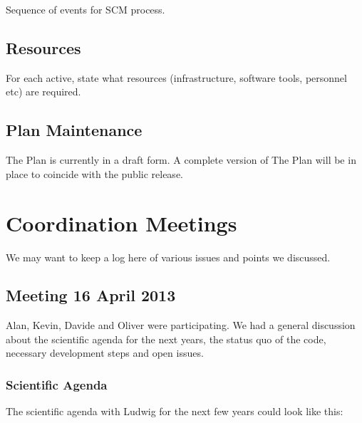 \documentclass[11pt,twoside]{article}
\begin{document}
Sequence of events for SCM process.

\subsection{Resources}

For each active, state what resources (infrastructure, software tools,
personnel etc) are required.


\subsection{Plan Maintenance}

The Plan is currently in a draft form. A complete version of The Plan
will be in place to coincide with the public release.

\newpage
\section{Coordination Meetings}

We may want to keep a log here of various issues and points we discussed.

\subsection{Meeting 16 April 2013}

Alan, Kevin, Davide and Oliver were participating.
We had a general discussion about the scientific agenda for the 
next years, the status quo of the code, necessary development 
steps and open issues.

\subsubsection{Scientific Agenda}

The scientific agenda with Ludwig for the next few years could look like this:
\end{document}
